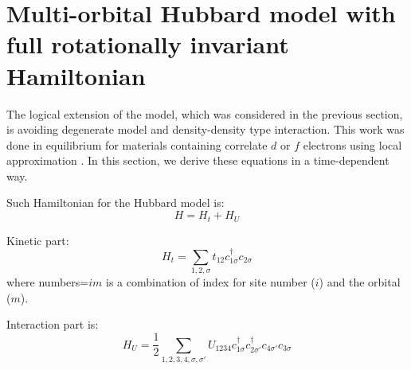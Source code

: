 

\FloatBarrier

\section{Multi-orbital Hubbard model with full rotationally invariant Hamiltonian}
\label{section:Mb_Hubbard_frH}
The logical extension of the model, which was considered in the previous section, is avoiding degenerate model and density-density type interaction. This work was done in equilibrium for materials containing correlate $d$ or $f$ electrons using local approximation \citep{PhysRevB.57.6884}. In this section, we derive these equations in a time-dependent way.

Such Hamiltonian for the Hubbard model is:
\begin{equation}
H = H_t + H_U
\end{equation}

Kinetic part:
\begin{equation}
H_t = \sum_{1,2,\sigma} t_{12}c^{\dagger}_{1\sigma} c_{2\sigma}
\end{equation}
where numbers=$im$ is a combination of index for site number ($i$) and the orbital ($m$).

Interaction part is:
\begin{equation}
H_U = \frac{1}{2} \sum_{1,2,3,4,\sigma,\sigma'} U_{1234}c^{\dagger}_{1\sigma} c^{\dagger}_{2\sigma'} c_{4\sigma'} c_{3\sigma}
\end{equation}

